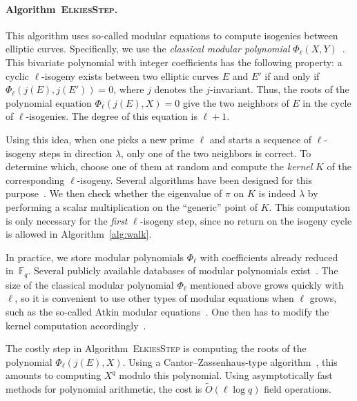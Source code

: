 \documentclass{article}
\newcommand{\F}{\mathbb{F}}
\newcommand{\softO}{\tilde{O}}
\newcommand{\algstyle}[1]{\textsc{#1}}
\theoremstyle{definition}
\begin{document}
\paragraph{Algorithm~\algstyle{ElkiesStep}.} This algorithm uses
so-called modular equations to compute isogenies between elliptic
curves.  Specifically, we use the \emph{classical modular polynomial}
$\Phi_\ell(X, Y)$~\cite{todo:classicalmodpoly}.
This bivariate polynomial with integer coefficients has
the following property: a cyclic $\ell$-isogeny exists between two elliptic
curves $E$ and $E'$ if and only if $\Phi_\ell(j(E), j(E')) = 0$,
where $j$ denotes the $j$-invariant. Thus, the roots
of the polynomial equation $\Phi_\ell(j(E), X)=0$ give the two neighbors
of $E$ in the cycle of $\ell$-isogenies. The degree of this equation
is $\ell+1$.

Using this idea, when one picks a new prime $\ell$ and starts a sequence
of $\ell$-isogeny steps in direction $\lambda$, 
only one of the two neighbors is
correct. To determine which, choose one of them at random and
compute the \emph{kernel} $K$ of the corresponding $\ell$-isogeny. Several
algorithms have been designed for this purpose~\cite{todo:isogkernel}.
We then check whether the eigenvalue of $\pi$ on $K$ is indeed $\lambda$
by performing a scalar multiplication on the ``generic'' point of $K$.
This computation is only necessary for the \emph{first} $\ell$-isogeny
step, since no return on the isogeny cycle is allowed in Algorithm~\ref{alg:walk}.

In practice, we store modular polynomials $\Phi_\ell$
with coefficients already reduced in~$\F_q$. 
Several publicly available databases of modular polynomials
exist~\cite{todo:modulardatabases}. The size of the classical modular polynomial
$\Phi_\ell$ mentioned above grows quickly with $\ell$, so it is convenient
to use other types of modular equations when $\ell$ grows, such as the so-called
Atkin modular equations~\cite{todo:atkinmodpoly}. One then has to
modify the kernel computation accordingly~\cite{todo:isogkernelatkin}.

The costly step in Algorithm~\algstyle{ElkiesStep} is computing the roots
of the polynomial $\Phi_\ell(j(E), X)$. Using a Cantor--Zassenhaus-type
algorithm~\cite{todo:canzass}, this amounts to computing $X^q$ modulo
this polynomial. Using asymptotically fast methods for polynomial
arithmetic, the cost is $\softO(\ell\log q)$ field operations.
\end{document}
